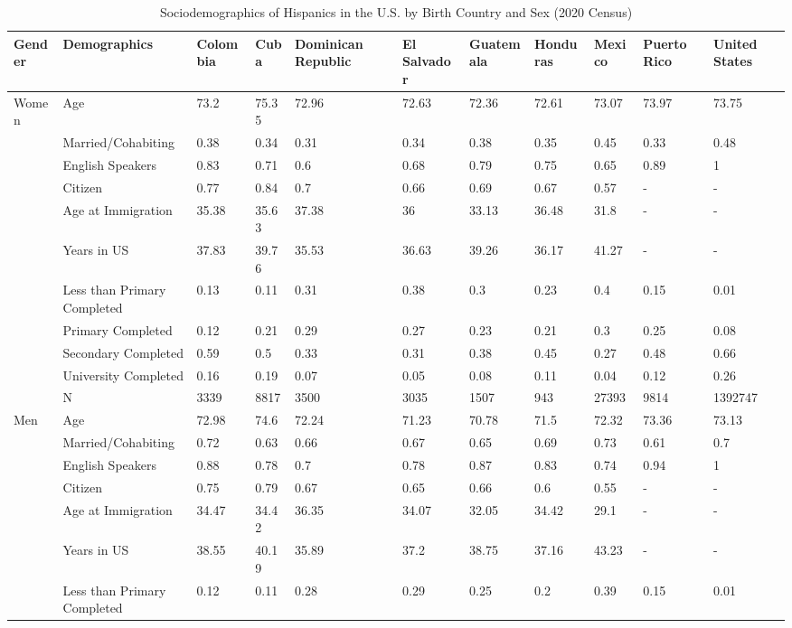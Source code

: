 \documentclass[
]{article}
\begin{document}
\begin{landscape}
\begin{table}[ht]
\centering
\caption{Sociodemographics of Hispanics in the U.S. by Birth Country and Sex (2020 Census)} 
\begingroup\small
\begin{tabular}{l|l|lllllllll}
  \hline
Gender & Demographics & Colombia & Cuba & Dominican Republic & El Salvador & Guatemala & Honduras & Mexico & Puerto Rico & United States \\ 
  \hline
Women & Age & 73.2 & 75.35 & 72.96 & 72.63 & 72.36 & 72.61 & 73.07 & 73.97 & 73.75 \\ 
   & Married/Cohabiting & 0.38 & 0.34 & 0.31 & 0.34 & 0.38 & 0.35 & 0.45 & 0.33 & 0.48 \\ 
   & English Speakers & 0.83 & 0.71 & 0.6 & 0.68 & 0.79 & 0.75 & 0.65 & 0.89 & 1 \\ 
   & Citizen & 0.77 & 0.84 & 0.7 & 0.66 & 0.69 & 0.67 & 0.57 & - & - \\ 
   & Age at Immigration & 35.38 & 35.63 & 37.38 & 36 & 33.13 & 36.48 & 31.8 & - & - \\ 
   & Years in US & 37.83 & 39.76 & 35.53 & 36.63 & 39.26 & 36.17 & 41.27 & - & - \\ 
   & Less than Primary Completed & 0.13 & 0.11 & 0.31 & 0.38 & 0.3 & 0.23 & 0.4 & 0.15 & 0.01 \\ 
   & Primary Completed & 0.12 & 0.21 & 0.29 & 0.27 & 0.23 & 0.21 & 0.3 & 0.25 & 0.08 \\ 
   & Secondary Completed & 0.59 & 0.5 & 0.33 & 0.31 & 0.38 & 0.45 & 0.27 & 0.48 & 0.66 \\ 
   & University Completed & 0.16 & 0.19 & 0.07 & 0.05 & 0.08 & 0.11 & 0.04 & 0.12 & 0.26 \\ 
   & N & 3339 & 8817 & 3500 & 3035 & 1507 & 943 & 27393 & 9814 & 1392747 \\ 
  Men & Age & 72.98 & 74.6 & 72.24 & 71.23 & 70.78 & 71.5 & 72.32 & 73.36 & 73.13 \\ 
   & Married/Cohabiting & 0.72 & 0.63 & 0.66 & 0.67 & 0.65 & 0.69 & 0.73 & 0.61 & 0.7 \\ 
   & English Speakers & 0.88 & 0.78 & 0.7 & 0.78 & 0.87 & 0.83 & 0.74 & 0.94 & 1 \\ 
   & Citizen & 0.75 & 0.79 & 0.67 & 0.65 & 0.66 & 0.6 & 0.55 & - & - \\ 
   & Age at Immigration & 34.47 & 34.42 & 36.35 & 34.07 & 32.05 & 34.42 & 29.1 & - & - \\ 
   & Years in US & 38.55 & 40.19 & 35.89 & 37.2 & 38.75 & 37.16 & 43.23 & - & - \\ 
   & Less than Primary Completed & 0.12 & 0.11 & 0.28 & 0.29 & 0.25 & 0.2 & 0.39 & 0.15 & 0.01 \\ 

\end{tabular}
\end{table}
\end{landscape}
\end{document}

